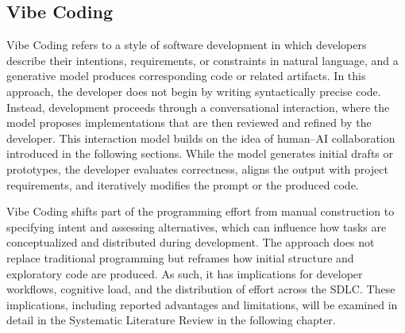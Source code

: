 \subsection{Vibe Coding}

Vibe Coding refers to a style of software development in which developers describe their intentions, requirements, or constraints in natural language, and a generative model produces corresponding code or related artifacts. In this approach, the developer does not begin by writing syntactically precise code. Instead, development proceeds through a conversational interaction, where the model proposes implementations that are then reviewed and refined by the developer. This interaction model builds on the idea of human–AI collaboration introduced in the following sections. While the model generates initial drafts or prototypes, the developer evaluates correctness, aligns the output with project requirements, and iteratively modifies the prompt or the produced code.

Vibe Coding shifts part of the programming effort from manual construction to specifying intent and assessing alternatives, which can influence how tasks are conceptualized and distributed during development. The approach does not replace traditional programming but reframes how initial structure and exploratory code are produced. As such, it has implications for developer workflows, cognitive load, and the distribution of effort across the SDLC. These implications, including reported advantages and limitations, will be examined in detail in the Systematic Literature Review in the following chapter. \cite{Moore:2025vc, Zamfiroiu:2025ec}